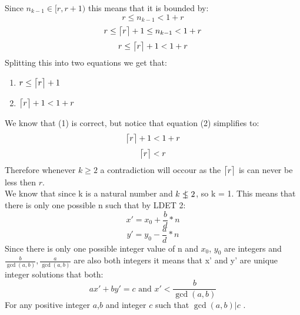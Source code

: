 \documentclass[11pt]{article}
\DeclarePairedDelimiter{\ceil}{\lceil}{\rceil}
\newcommand{\nlet}{%
  \mathrel{\ooalign{$\leq$\cr\hidewidth$|$\hidewidth}}%
}
\begin{document}
Since $n_{k-1} \in [r,r+1)$ this means that it is bounded by:
\[r \leq n_{k-1} < 1+ r\]
\[r \leq \ceil[\big]{r} + 1 \leq n_{k-1} < 1+ r\]
\[r \leq \ceil[\big]{r} + 1 < 1+ r\]
Splitting this into two equations we get that:
\begin{enumerate}
\item $r \leq \ceil[\big]{r} + 1$
\item $\ceil[\big]{r} + 1 < 1+ r$
\end{enumerate}
We know that (1) is correct, but notice that equation (2) simplifies to:
\[\ceil[\big]{r} + 1 < 1+ r\]
\[\ceil[\big]{r} < r\]
Therefore whenever $k\geq2$ a contradiction will occour as the $\ceil[\big]{r}$ is can never be less then $r$.\\
We know that since k is a natural number and $k \nlet 2$, so  k = 1. This means that there is only one possible n such that by LDET 2:
\[ x' = x_0 + \frac{b}{d} * n \]
\[ y' = y_0 - \frac{a}{d} * n \]
Since there is only one possible integer value of  n and $x_0$, $y_0$  are integers and $\frac{b}{\gcd(a,b)}, \frac{a}{\gcd(a,b)}$ are also both integers it means that x' and y' are unique integer solutions that both:
\[ ax'+ by' = c  \text{ and } x' < \frac{b}{\gcd(a,b)} \]
For any positive integer $a$,$b$ and integer $c$ such that $\gcd(a,b)|c$ .
\end{document}
